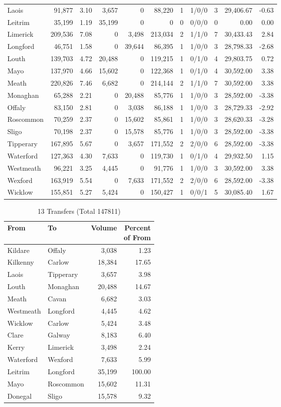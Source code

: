 \documentclass[a4paper]{article}
\begin{document}
\begin{longtable}{lrrrrrrlrrr}
Laois&91,877& 3.10&3,657&0&88,220&1&1/0/0&3&29,406.67&-0.63\\ 
Leitrim&35,199& 1.19&35,199&0&0&0&0/0/0&0& 0.00& 0.00\\ 
Limerick&209,536& 7.08&0&3,498&213,034&2&1/1/0&7&30,433.43& 2.84\\ 
Longford&46,751& 1.58&0&39,644&86,395&1&1/0/0&3&28,798.33&-2.68\\ 
Louth&139,703& 4.72&20,488&0&119,215&1&0/1/0&4&29,803.75& 0.72\\ 
Mayo&137,970& 4.66&15,602&0&122,368&1&0/1/0&4&30,592.00& 3.38\\ 
Meath&220,826& 7.46&6,682&0&214,144&2&1/1/0&7&30,592.00& 3.38\\ 
Monaghan&65,288& 2.21&0&20,488&85,776&1&1/0/0&3&28,592.00&-3.38\\ 
Offaly&83,150& 2.81&0&3,038&86,188&1&1/0/0&3&28,729.33&-2.92\\ 
Roscommon&70,259& 2.37&0&15,602&85,861&1&1/0/0&3&28,620.33&-3.28\\ 
Sligo&70,198& 2.37&0&15,578&85,776&1&1/0/0&3&28,592.00&-3.38\\ 
Tipperary&167,895& 5.67&0&3,657&171,552&2&2/0/0&6&28,592.00&-3.38\\ 
Waterford&127,363& 4.30&7,633&0&119,730&1&0/1/0&4&29,932.50& 1.15\\ 
Westmeath&96,221& 3.25&4,445&0&91,776&1&1/0/0&3&30,592.00& 3.38\\ 
Wexford&163,919& 5.54&0&7,633&171,552&2&2/0/0&6&28,592.00&-3.38\\ 
Wicklow&155,851& 5.27&5,424&0&150,427&1&0/0/1&5&30,085.40& 1.67\\ 
\end{longtable}

\begin{table}[htbp]
\caption{13 Transfers (Total 147811)}
\centering
\begin{tabular}{llrr} \toprule
From &To &Volume &\shortstack{Percent\\of From} \\ \midrule
Kildare&Offaly&3,038& 1.23\\ 
Kilkenny&Carlow&18,384&17.65\\ 
Laois&Tipperary&3,657& 3.98\\ 
Louth&Monaghan&20,488&14.67\\ 
Meath&Cavan&6,682& 3.03\\ 
Westmeath&Longford&4,445& 4.62\\ 
Wicklow&Carlow&5,424& 3.48\\ 
Clare&Galway&8,183& 6.40\\ 
Kerry&Limerick&3,498& 2.24\\ 
Waterford&Wexford&7,633& 5.99\\ 
Leitrim&Longford&35,199&100.00\\ 
Mayo&Roscommon&15,602&11.31\\ 
Donegal&Sligo&15,578& 9.32\\ 
\bottomrule
\end{tabular}
\end{table}
\end{document}
